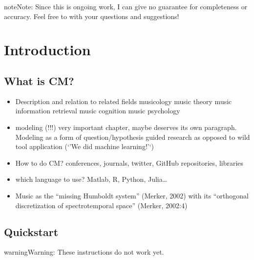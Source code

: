 \documentclass[letterpaper,10pt,english]{sphinxmanual}
\begin{document}
\begin{sphinxadmonition}{note}{Note:}
Since this is ongoing work, I can give no guarantee for completeness or accuracy.
Feel free to  with your questions and suggestions!
\end{sphinxadmonition}


\chapter{Introduction}
\label{\detokenize{1_intro:introduction}}\label{\detokenize{1_intro::doc}}

\section{What is CM?}
\label{\detokenize{1_intro:what-is-cm}}\begin{itemize}
\item {} 
Description and relation to related fields
\textendash{} musicology
\textendash{} music theory
\textendash{} music information retrieval
\textendash{} music cognition
\textendash{} music psychology

\item {} 
modeling (!!!) very important chapter, maybe deserves its own paragraph. Modeling as a form of question/hypothesis guided research as opposed to wild tool application (‘’We did machine learning!’‘)

\item {} 
How to do CM? conferences, journals, twitter, GitHub repositories, libraries

\item {} 
which language to use? Matlab, R, Python, Julia…

\item {} 
Music as the “missing Humboldt system” (Merker, 2002) with its “orthogonal discretization of spectro\sphinxhyphen{}temporal space” (Merker, 2002:4)

\end{itemize}


\section{Quickstart}
\label{\detokenize{1_intro:quickstart}}
\begin{sphinxadmonition}{warning}{Warning:}
These instructions do not work yet.
\end{sphinxadmonition}
\end{document}
